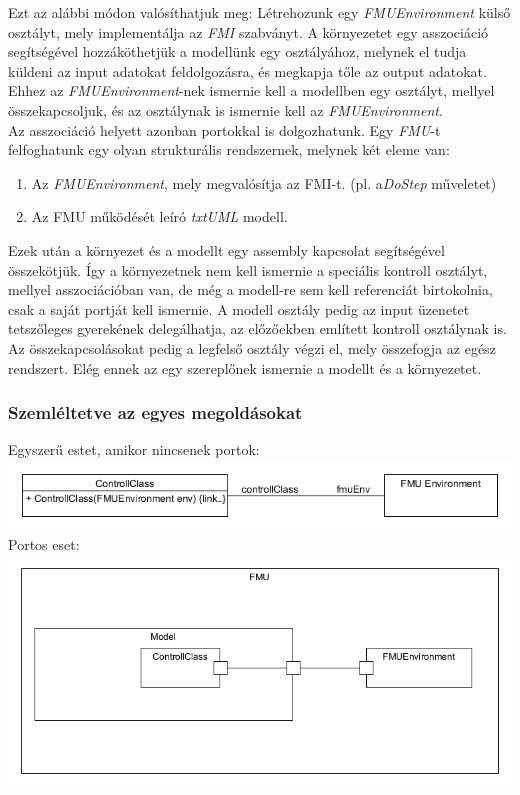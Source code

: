 \documentclass[a4paper,12pt]{report}
\begin{document}
Ezt az alábbi módon valósíthatjuk meg: Létrehozunk egy \textit{FMUEnvironment} külső osztályt, mely implementálja az \textit{FMI} szabványt. A környezetet egy asszociáció segítségével hozzáköthetjük a modellünk egy osztályához,  melynek el tudja küldeni az input adatokat feldolgozásra, és megkapja tőle az output adatokat. Ehhez az \textit{FMUEnvironment}-nek ismernie kell a modellben egy osztályt, mellyel összekapcsoljuk, és az osztálynak is ismernie kell az \textit{FMUEnvironment}.   \\
Az asszociáció helyett azonban portokkal is dolgozhatunk. Egy \textit{FMU}-t felfoghatunk egy olyan strukturális rendszernek, melynek két eleme van:
\begin{enumerate}
\item Az \textit{FMUEnvironment}, mely megvalósítja az FMI-t. (pl. a\textit{DoStep} műveletet)
\item Az FMU működését leíró \textit{txtUML} modell.
\end{enumerate}
Ezek után a környezet és a modellt egy assembly kapcsolat segítségével összekötjük. Így a környezetnek nem kell ismernie a speciális kontroll osztályt, mellyel asszociációban van, de még a modell-re sem kell referenciát birtokolnia, csak a saját portját kell ismernie. A modell osztály pedig az input üzenetet tetszőleges gyerekének delegálhatja, az előzőekben említett kontroll osztálynak is. Az összekapcsolásokat pedig a legfelső osztály végzi el, mely összefogja az egész rendszert. Elég ennek az egy szereplőnek ismernie a modellt és a környezetet.  \\

\subsubsection{Szemléltetve az egyes megoldásokat}

Egyszerű estet, amikor nincsenek portok: \\
\includegraphics[scale=0.6]{fmu_simple.png} \\

Portos eset: \\
\includegraphics[scale=0.6]{fmu_with_ports.png} \\
\end{document}
